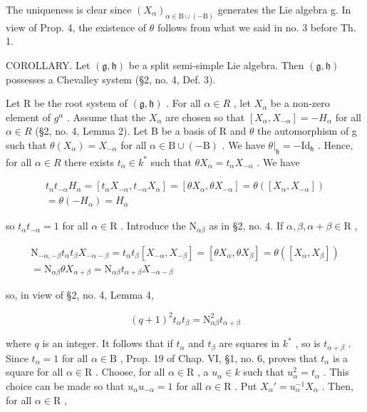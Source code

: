 The uniqueness is clear since \((X_{\alpha})_{\alpha\in\mathrm{B}\cup(-\mathrm{B})}\) generates the Lie algebra g. In view of Prop. 4, the existence of \(\theta\) follows from what we said in no. 3 before Th. 1.

COROLLARY. Let \((\mathfrak{g},\mathfrak{h})\) be a split semi-simple Lie algebra. Then \((\mathfrak{g},\mathfrak{h})\) possesses a Chevalley system (§2, no. 4, Def. 3).

Let R be the root system of \((\mathfrak{g},\mathfrak{h})\) . For all \(\alpha\in R\) , let \(X_{\alpha}\) be a non-zero element of \(g^{\alpha}\) . Assume that the \(X_{\alpha}\) are chosen so that \([X_{\alpha},X_{-\alpha}]=-H_{\alpha}\) for all \(\alpha\in R\) (§2, no. 4, Lemma 2). Let B be a basis of R and \(\theta\) the automorphism of g such that \(\theta(X_{\alpha})=X_{-\alpha}\) for all \(\alpha\in\mathrm{B}\cup(-\mathrm{B})\) . We have \(\theta|_{\mathfrak{h}}=-\mathrm{Id}_{\mathfrak{h}}\) . Hence, for all \(\alpha\in R\) there exists \(t_{\alpha}\in k^{*}\) such that \(\theta X_{\alpha}=t_{\alpha}X_{-\alpha}\) . We have

\[
\begin{array}{c} t _ {\alpha} t _ {- \alpha} H _ {\alpha} = [ t _ {\alpha} X _ {- \alpha}, t _ {- \alpha} X _ {\alpha} ] = [ \theta X _ {\alpha}, \theta X _ {- \alpha} ] = \theta ([ X _ {\alpha}, X _ {- \alpha} ]) \\ = \theta (- H _ {\alpha}) = H _ {\alpha} \end{array}
\]

so \(t_{\alpha}t_{-\alpha} = 1\) for all \(\alpha \in \mathrm{R}\) . Introduce the \(\mathrm{N}_{\alpha \beta}\) as in §2, no. 4. If \(\alpha, \beta, \alpha + \beta \in \mathrm{R}\) ,

\[
\begin{array}{r} \mathrm{N} _ {- \alpha , - \beta} t _ {\alpha} t _ {\beta} X _ {- \alpha - \beta} = t _ {\alpha} t _ {\beta} [ X _ {- \alpha}, X _ {- \beta} ] = [ \theta X _ {\alpha}, \theta X _ {\beta} ] = \theta ([ X _ {\alpha}, X _ {\beta} ]) \\ = \mathrm{N} _ {\alpha \beta} \theta X _ {\alpha + \beta} = \mathrm{N} _ {\alpha \beta} t _ {\alpha + \beta} X _ {- \alpha - \beta} \end{array}
\]

so, in view of §2, no. 4, Lemma 4,

\[
(q + 1) ^ {2} t _ {\alpha} t _ {\beta} = \mathrm{N} _ {\alpha \beta} ^ {2} t _ {\alpha + \beta}
\]

where \(q\) is an integer. It follows that if \(t_{\alpha}\) and \(t_{\beta}\) are squares in \(k^*\) , so is \(t_{\alpha + \beta}\) . Since \(t_{\alpha} = 1\) for all \(\alpha \in \mathrm{B}\) , Prop. 19 of Chap. VI, §1, no. 6, proves that \(t_{\alpha}\) is a square for all \(\alpha \in \mathrm{R}\) . Choose, for all \(\alpha \in \mathrm{R}\) , a \(u_{\alpha} \in k\) such that \(u_{\alpha}^{2} = t_{\alpha}\) . This choice can be made so that \(u_{\alpha}u_{-\alpha} = 1\) for all \(\alpha \in \mathrm{R}\) . Put \(X_{\alpha}' = u_{\alpha}^{-1}X_{\alpha}\) . Then, for all \(\alpha \in \mathrm{R}\) ,

